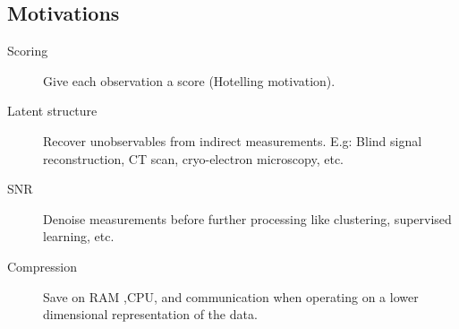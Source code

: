 \documentclass[12pt,a4paper]{article}
\begin{document}
\subsection{Motivations}

\begin{description}
	\item [Scoring] Give each observation a score (Hotelling motivation).

	\item [Latent structure] Recover unobservables from indirect measurements. 
	E.g: Blind signal reconstruction, CT scan, cryo-electron microscopy, etc. 
	
	\item [SNR] Denoise measurements before further processing like clustering, supervised learning, etc. 
	
	\item [Compression] Save on RAM ,CPU, and communication when operating on a lower dimensional representation of the data. 
	
\end{description}
\end{document}
